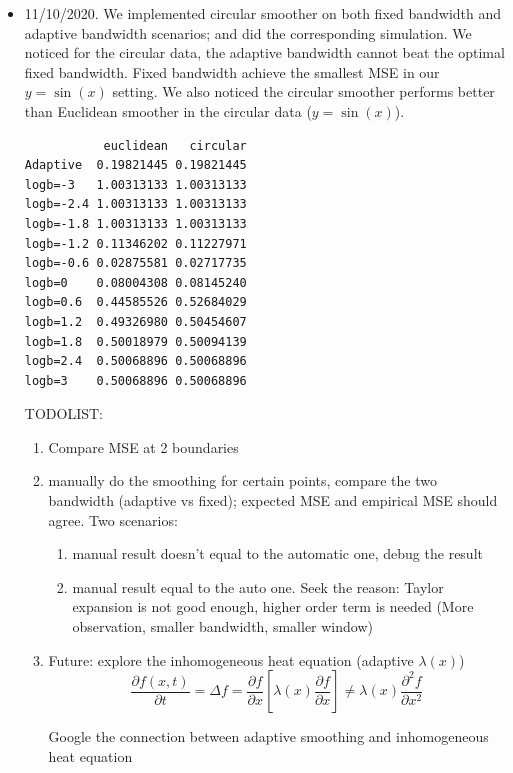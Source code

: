 \documentclass{article}
\begin{document}
\begin{itemize}
\item 11/10/2020. We implemented circular smoother on both fixed bandwidth and adaptive bandwidth scenarios; and did the corresponding simulation. We noticed for the circular data, the adaptive bandwidth cannot beat the optimal fixed bandwidth. Fixed bandwidth achieve the smallest MSE in our $y=\sin(x)$ setting. We also noticed the circular smoother performs better than Euclidean smoother in the circular data ($y=\sin(x)$). 

\begin{verbatim}
           euclidean   circular
Adaptive  0.19821445 0.19821445
logb=-3   1.00313133 1.00313133
logb=-2.4 1.00313133 1.00313133
logb=-1.8 1.00313133 1.00313133
logb=-1.2 0.11346202 0.11227971
logb=-0.6 0.02875581 0.02717735
logb=0    0.08004308 0.08145240
logb=0.6  0.44585526 0.52684029
logb=1.2  0.49326980 0.50454607
logb=1.8  0.50018979 0.50094139
logb=2.4  0.50068896 0.50068896
logb=3    0.50068896 0.50068896
\end{verbatim}


TODOLIST:
  \begin{enumerate}
    \item Compare MSE at 2 boundaries 
    \item manually do the smoothing for certain points, compare the two bandwidth (adaptive vs fixed); expected MSE and empirical MSE should agree. Two scenarios:
    \begin{enumerate}
    \item manual result doesn't equal to the automatic one, debug the result
    \item manual result equal to the auto one. Seek the reason: Taylor expansion is not good enough, higher order term is needed (More observation, smaller bandwidth, smaller window)
    \end{enumerate}
    \item Future: explore the inhomogeneous heat equation (adaptive $\lambda(x)$) 
    $$\frac{\partial f(x,t)}{\partial t}  = \Delta f = \frac{\partial f}{\partial x}[\lambda(x)\frac{\partial f}{\partial x}] \neq  \lambda(x)\frac{\partial^2 f}{
    \partial x^2} $$

    Google the connection between adaptive smoothing and inhomogeneous heat equation 
  \end{enumerate} 




\end{itemize}
\end{document}
